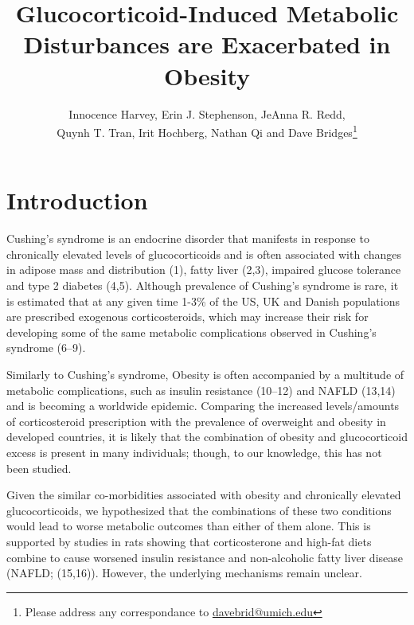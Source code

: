 \documentclass[11pt]{article} %
\date{} %
\title{Glucocorticoid-Induced Metabolic Disturbances are Exacerbated in
Obesity}
\author{Innocence Harvey, Erin J. Stephenson, JeAnna R. Redd,\\ Quynh T. Tran,
Irit Hochberg, Nathan Qi and Dave Bridges\footnote{Please address any correspondance to \href{mailto:davebrid@umich.edu}{davebrid@umich.edu}}}
\begin{document}
\maketitle


\section*{Introduction }

Cushing's syndrome is an endocrine disorder that manifests in response
to chronically elevated levels of glucocorticoids and is often
associated with changes in adipose mass and distribution (1), fatty
liver (2,3), impaired glucose tolerance and type 2 diabetes (4,5).
Although prevalence of Cushing's syndrome is rare, it is estimated that
at any given time 1-3\% of the US, UK and Danish populations are
prescribed exogenous corticosteroids, which may increase their risk for
developing some of the same metabolic complications observed in
Cushing's syndrome (6--9).

Similarly to Cushing's syndrome, Obesity is often accompanied by a
multitude of metabolic complications, such as insulin resistance
(10--12) and NAFLD (13,14) and is becoming a worldwide epidemic.
Comparing the increased levels/amounts of corticosteroid prescription
with the prevalence of overweight and obesity in developed countries, it
is likely that the combination of obesity and glucocorticoid excess is
present in many individuals; though, to our knowledge, this has not been
studied.

Given the similar co-morbidities associated with obesity and chronically
elevated glucocorticoids, we hypothesized that the combinations of these
two conditions would lead to worse metabolic outcomes than either of
them alone. This is supported by studies in rats showing that
corticosterone and high-fat diets combine to cause worsened insulin
resistance and non-alcoholic fatty liver disease (NAFLD; (15,16)).
However, the underlying mechanisms remain unclear.
\end{document}
